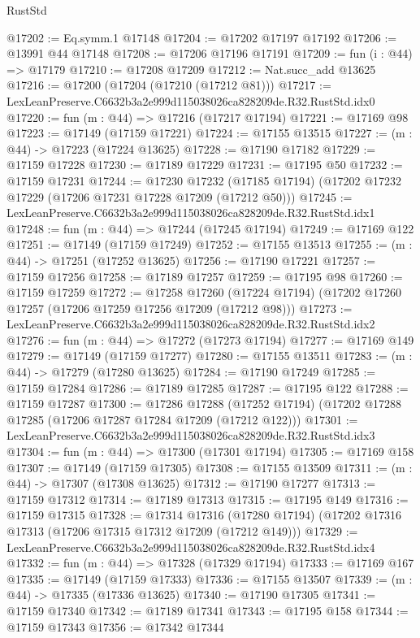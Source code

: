 \begin{lexlean}{RustStd}
\begin{coremodule}
@17202 := Eq.symm.{1} @17148
@17204 := @17202 @17197 @17192
@17206 := @13991 @44 @17148
@17208 := @17206 @17196 @17191
@17209 := fun (i : @44) => @17179
@17210 := @17208 @17209
@17212 := Nat.succ_add @13625
@17216 := @17200 (@17204 (@17210 (@17212 @81)))
@17217 := LexLeanPreserve.C6632b3a2e999d115038026ca828209de.R32.RustStd.idx0
@17220 := fun (m : @44) => @17216 (@17217 @17194)
@17221 := @17169 @98
@17223 := @17149 (@17159 @17221)
@17224 := @17155 @13515
@17227 := (m : @44) -> @17223 (@17224 @13625)
@17228 := @17190 @17182
@17229 := @17159 @17228
@17230 := @17189 @17229
@17231 := @17195 @50
@17232 := @17159 @17231
@17244 := @17230
    @17232
    (@17185 @17194)
    (@17202 @17232 @17229 (@17206 @17231 @17228 @17209 (@17212 @50)))
@17245 := LexLeanPreserve.C6632b3a2e999d115038026ca828209de.R32.RustStd.idx1
@17248 := fun (m : @44) => @17244 (@17245 @17194)
@17249 := @17169 @122
@17251 := @17149 (@17159 @17249)
@17252 := @17155 @13513
@17255 := (m : @44) -> @17251 (@17252 @13625)
@17256 := @17190 @17221
@17257 := @17159 @17256
@17258 := @17189 @17257
@17259 := @17195 @98
@17260 := @17159 @17259
@17272 := @17258
    @17260
    (@17224 @17194)
    (@17202 @17260 @17257 (@17206 @17259 @17256 @17209 (@17212 @98)))
@17273 := LexLeanPreserve.C6632b3a2e999d115038026ca828209de.R32.RustStd.idx2
@17276 := fun (m : @44) => @17272 (@17273 @17194)
@17277 := @17169 @149
@17279 := @17149 (@17159 @17277)
@17280 := @17155 @13511
@17283 := (m : @44) -> @17279 (@17280 @13625)
@17284 := @17190 @17249
@17285 := @17159 @17284
@17286 := @17189 @17285
@17287 := @17195 @122
@17288 := @17159 @17287
@17300 := @17286
    @17288
    (@17252 @17194)
    (@17202 @17288 @17285 (@17206 @17287 @17284 @17209 (@17212 @122)))
@17301 := LexLeanPreserve.C6632b3a2e999d115038026ca828209de.R32.RustStd.idx3
@17304 := fun (m : @44) => @17300 (@17301 @17194)
@17305 := @17169 @158
@17307 := @17149 (@17159 @17305)
@17308 := @17155 @13509
@17311 := (m : @44) -> @17307 (@17308 @13625)
@17312 := @17190 @17277
@17313 := @17159 @17312
@17314 := @17189 @17313
@17315 := @17195 @149
@17316 := @17159 @17315
@17328 := @17314
    @17316
    (@17280 @17194)
    (@17202 @17316 @17313 (@17206 @17315 @17312 @17209 (@17212 @149)))
@17329 := LexLeanPreserve.C6632b3a2e999d115038026ca828209de.R32.RustStd.idx4
@17332 := fun (m : @44) => @17328 (@17329 @17194)
@17333 := @17169 @167
@17335 := @17149 (@17159 @17333)
@17336 := @17155 @13507
@17339 := (m : @44) -> @17335 (@17336 @13625)
@17340 := @17190 @17305
@17341 := @17159 @17340
@17342 := @17189 @17341
@17343 := @17195 @158
@17344 := @17159 @17343
@17356 := @17342
    @17344

\end{coremodule}
\end{lexlean}
